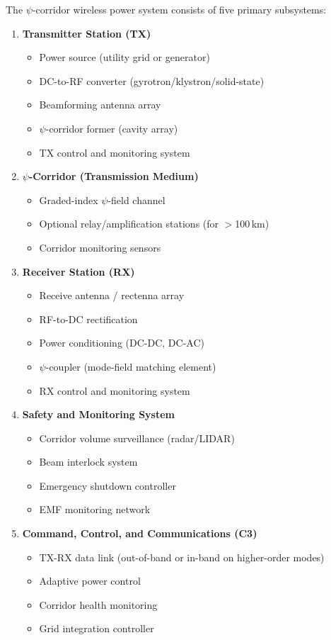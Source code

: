 \documentclass[11pt,a4paper]{article}
\begin{document}
The $\psi$-corridor wireless power system consists of five primary subsystems:

\begin{enumerate}
\item \textbf{Transmitter Station (TX)}
    \begin{itemize}
    \item Power source (utility grid or generator)
    \item DC-to-RF converter (gyrotron/klystron/solid-state)
    \item Beamforming antenna array
    \item $\psi$-corridor former (cavity array)
    \item TX control and monitoring system
    \end{itemize}

\item \textbf{$\psi$-Corridor (Transmission Medium)}
    \begin{itemize}
    \item Graded-index $\psi$-field channel
    \item Optional relay/amplification stations (for $>$100\,km)
    \item Corridor monitoring sensors
    \end{itemize}

\item \textbf{Receiver Station (RX)}
    \begin{itemize}
    \item Receive antenna / rectenna array
    \item RF-to-DC rectification
    \item Power conditioning (DC-DC, DC-AC)
    \item $\psi$-coupler (mode-field matching element)
    \item RX control and monitoring system
    \end{itemize}

\item \textbf{Safety and Monitoring System}
    \begin{itemize}
    \item Corridor volume surveillance (radar/LIDAR)
    \item Beam interlock system
    \item Emergency shutdown controller
    \item EMF monitoring network
    \end{itemize}

\item \textbf{Command, Control, and Communications (C3)}
    \begin{itemize}
    \item TX-RX data link (out-of-band or in-band on higher-order modes)
    \item Adaptive power control
    \item Corridor health monitoring
    \item Grid integration controller
    \end{itemize}
\end{enumerate}
\end{document}
